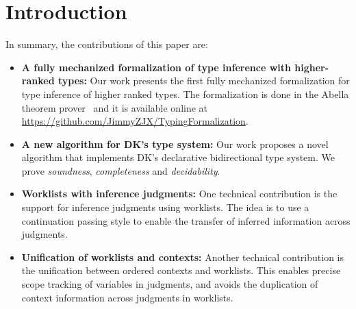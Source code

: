 \section{Introduction}





In summary, the contributions of this paper are:

\begin{itemize}

\item {\bf A fully mechanized formalization of type inference with
  higher-ranked types:} Our work presents the first fully mechanized formalization
  for type inference of higher ranked types. The formalization is done in the
  Abella theorem prover~\cite{AbellaDesc} and it is available
  online at \url{https://github.com/JimmyZJX/TypingFormalization}.

\item {\bf A new algorithm for DK's type system:} Our work proposes a novel algorithm that implements
  DK's declarative bidirectional type system. We prove
  \emph{soundness}, \emph{completeness} and
  \emph{decidability}. 

\item {\bf Worklists with inference judgments:} One technical contribution is the
  support for inference judgments using worklists. The idea is to
  use a continuation passing style to enable the transfer of inferred information across
  judgments. 

\item {\bf Unification of worklists and contexts:} Another technical contribution is the unification
  between ordered contexts and worklists. This enables precise scope tracking
  of variables in judgments, and avoids the duplication of context information across
  judgments in worklists.

\begin{comment}
\jimmy{Notes @20190211 4 points of novalty:\\
1) Dealing with inference judgments and CPS-style chains\\
2) The form of the judgment itself with a single shared context\\
3) The way we deal with scope (which may follow from 2)\\
4) Immediate substitution (judgment list)
}
\end{comment}

\end{itemize}
